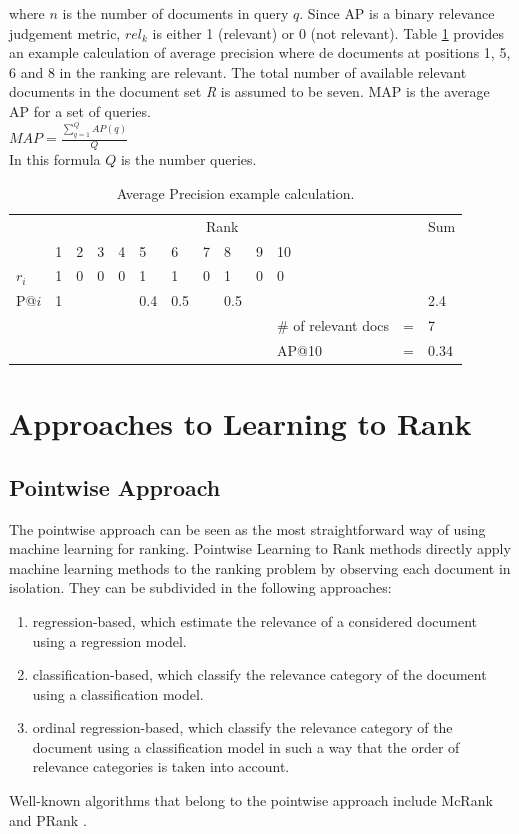 where $n$ is the number of documents in query $q$. Since \ac{AP} is a binary relevance judgement metric, $rel_k$ is either 1 (relevant) or 0 (not relevant). Table \ref{tab:example_calculation_AP} provides an example calculation of average precision where de documents at positions 1, 5, 6 and 8 in the ranking are relevant. The total number of available relevant documents in the document set \emph{R} is assumed to be seven. \ac{MAP} is the average \ac{AP} for a set of queries.\\

$MAP = \frac{\sum\nolimits_{q=1}^{Q}AP(q)}{Q}$\\

In this formula $Q$ is the number queries.

\begin{table}
\begin{tabular}{lllllllllllll}
 & \multicolumn{10}{c}{Rank} &  & Sum \\ 
\cline{2-11}
 & 1 & 2 & 3 & 4 & 5 & 6 & 7 & 8 & 9 & 10 &  &  \\ 
\hline
$r_i$ & 1 & 0 & 0 & 0 & 1 & 1 & 0 & 1 & 0 & 0 &  &  \\ 
P@$i$ & 1 &  &  &  & 0.4 & 0.5 &  & 0.5 &  &  &  & 2.4 \\ 
\hline
 &  &  &  &  &  &  &  &  &  & \# of relevant docs & = & 7 \\ 
 &  &  &  &  &  &  &  &  &  & AP@10 & = & 0.34 \\ 
\end{tabular}
\caption{Average Precision example calculation.}
\label{tab:example_calculation_AP}
\end{table}

\section{Approaches to Learning to Rank}
\label{sec:ltr_approaches}
\subsection{Pointwise Approach}
The pointwise approach can be seen as the most straightforward way of using machine learning for ranking. Pointwise Learning to Rank methods directly apply machine learning methods to the ranking problem by observing each document in isolation. They can be subdivided in the following approaches:
	\begin{enumerate}
	\item regression-based, which estimate the relevance of a considered document using a regression model.
	\item classification-based, which classify the relevance category of the document using a classification model.
	\item ordinal regression-based, which classify the relevance category of the document using a classification model in such a way that the order of relevance categories is taken into account. 
	\end{enumerate}
Well-known algorithms that belong to the pointwise approach include McRank \cite{Li2007} and PRank \cite{Crammer2001}.
